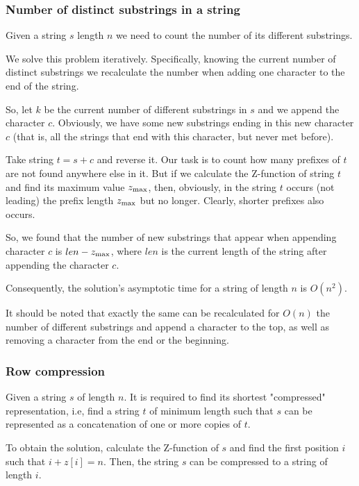 \subsubsection{ Number of distinct substrings in a string }

Given a string $s$ length $n$ we need to count the number of its different substrings.

We solve this problem iteratively. Specifically, knowing the current number of distinct substrings we recalculate the number when adding one character to the end of the string.

So, let $k$ be the current number of different substrings in $s$ and we append the character $c$. Obviously, we have some new substrings ending in this new character $c$ (that is, all the strings that end with this character, but never met before).

Take string $t = s + c$ and reverse it. Our task is to count how many prefixes of $t$ are not found anywhere else in it. But if we calculate the Z-function of string $t$ and find its maximum value $z_ {\rm max}$, then, obviously, in the string $t$ occurs (not leading) the prefix length $z_ {\rm max}$ but no longer. Clearly, shorter prefixes also occurs.

So, we found that the number of new substrings that appear when appending character $c$ is $len - z_ {\rm max}$, where $len$ is the current length of the string after appending the character $c$.

Consequently, the solution's asymptotic time for a string of length $n$ is $O (n ^ 2)$.

It should be noted that exactly the same can be recalculated for $O (n)$ the number of different substrings and append a character to the top, as well as removing a character from the end or the beginning.

\subsubsection{ Row compression }

Given a string $s$ of length $n$. It is required to find its shortest "compressed" representation, i.e, find a string $t$ of minimum length such that $s$ can be represented as a concatenation of one or more copies of $t$.

To obtain the solution, calculate the Z-function of $s$ and find the first position $i$ such that $i + z [i] = n$. Then, the string $s$ can be compressed to a string of length $i$.

